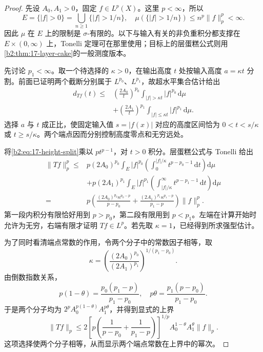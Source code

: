 \begin{proof}
先设 \(A_0,A_1>0\)，固定 \(f\in L^p(X)\)。这里 \(p<\infty\)，所以
\[
 E=\{|f|>0\}=\bigcup_{n\geq1}\{|f|>1/n\},
 \quad \mu(\{|f|>1/n\})\leq n^p\|f\|_p^p<\infty.
\]
因此 \(\mu\) 在 \(E\) 上的限制是 \(\sigma\)-有限的。以下与输入有关的非负重积分都支撑在 \(E\times(0,\infty)\) 上，Tonelli 定理可在那里使用；目标上的层蛋糕公式则用\cref{b2:thm:17-layer-cake}的一般测度版本。

先讨论 \(p_1<\infty\)。取一个待选择的 \(\kappa>0\)，在输出高度 \(t\) 处按输入高度 \(a=\kappa t\) 分割。前面已证明两个截断分别属于 \(L^{p_0}\)、\(L^{p_1}\)，故超水平集合估计给出
\begin{equation}\label{b2:eq:17-height-split}
 \begin{aligned}
 d_{Tf}(t)\leq{}&\left(\frac{2A_0}{t}\right)^{p_0}
       \int_{|f|>\kappa t}|f|^{p_0}\,\mathrm d\mu\\
 &+\left(\frac{2A_1}{t}\right)^{p_1}
       \int_{|f|\leq\kappa t}|f|^{p_1}\,\mathrm d\mu.
 \end{aligned}
\end{equation}
选择 \(a\) 与 \(t\) 成正比，使固定输入值 \(s=|f(x)|\) 对应的高度区间恰为 \(0<t<s/\kappa\) 或 \(t\geq s/\kappa\)。两个端点因而分别控制高度零点和无穷远处。

将\eqref{b2:eq:17-height-split}乘以 \(pt^{p-1}\)，对 \(t>0\) 积分。层蛋糕公式与 Tonelli 给出
\[
 \begin{aligned}
 \|Tf\|_p^p\leq{}&p(2A_0)^{p_0}
   \int_E |f|^{p_0}
      \left(\int_0^{|f|/\kappa}t^{p-p_0-1}\,\mathrm dt\right)\mathrm d\mu\\
 &+p(2A_1)^{p_1}
   \int_E |f|^{p_1}
      \left(\int_{|f|/\kappa}^\infty t^{p-p_1-1}\,\mathrm dt\right)\mathrm d\mu\\
 ={}&p\left(
   \frac{(2A_0)^{p_0}\kappa^{p_0-p}}{p-p_0}
  +\frac{(2A_1)^{p_1}\kappa^{p_1-p}}{p_1-p}\right)\|f\|_p^p.
 \end{aligned}
\]
第一段内积分有限恰好用到 \(p>p_0\)，第二段有限用到 \(p<p_1\)。左端在计算开始时允许为无穷，右端有限才证明 \(Tf\in L^p\)。若先取 \(\kappa=1\)，已经得到所求强型估计。

为了同时看清端点常数的作用，令两个分子中的常数因子相等，取
\[
 \kappa=\left(\frac{(2A_0)^{p_0}}{(2A_1)^{p_1}}\right)^{1/(p_1-p_0)}.
\]
由倒数指数关系，
\[
 p(1-\theta)=\frac{p_0(p_1-p)}{p_1-p_0},
 \quad p\theta=\frac{p_1(p-p_0)}{p_1-p_0}.
\]
于是两个分子均为
\(2^pA_0^{p(1-\theta)}A_1^{p\theta}\)，并得到显式的上界
\[
 \|Tf\|_p\leq
 2\left[p\left(\frac1{p-p_0}+\frac1{p_1-p}\right)\right]^{1/p}
 A_0^{1-\theta}A_1^\theta\|f\|_p.
\]
这项选择使两个分子相等，从而显示两个端点常数在上界中的幂次。


\end{proof}
